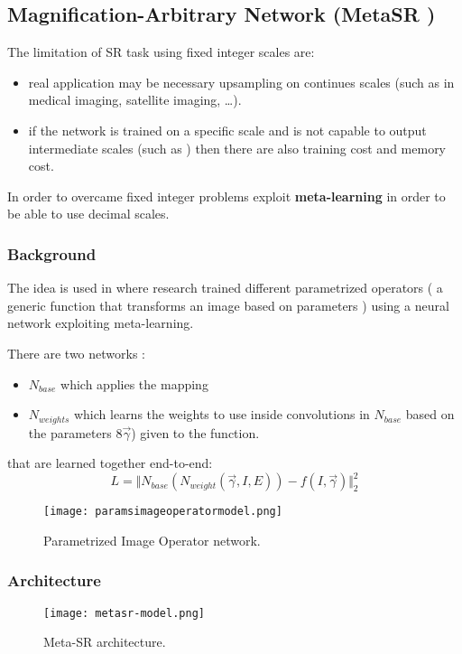 \subsection{Magnification-Arbitrary Network (MetaSR \cite{MetaSR})}\label{metasr}
The limitation of SR task using fixed integer scales are:
\begin{itemize}
    \item real application may be necessary upsampling on continues scales (such as in medical imaging, satellite imaging, \dots ).
    \item if the network is trained on a specific scale and is not capable to output intermediate scales (such as \cite{LapSRN}) then there are also training cost and memory cost.
\end{itemize}

In order to overcame fixed integer problems \cite{MetaSR} exploit \textbf{meta-learning} in order to be able to use decimal scales.

\subsubsection{Background}

The idea is used in \cite{ParametrizedImageOperator} where research trained different parametrized operators ( a generic function that transforms an image based on parameters ) using a neural network exploiting meta-learning.

There are two networks :
\begin{itemize}
    \item $N_{base}$ which applies the mapping
    \item $N_{weights}$ which learns the weights to use inside convolutions in $N_{base}$ based on the parameters 8$\vec{\gamma}$) given to the function. 
\end{itemize}
that are learned together end-to-end: 
$$
L = \Vert N_{base}(N_{weight}(\vec{\gamma},I,E)) - f(I,\vec{\gamma}) \Vert_2^2
$$
\begin{figure}
    \centering
    \texttt{[image: paramsimageoperatormodel.png]}
    \caption{Parametrized Image Operator network.}\label{PIO:model}
\end{figure}

\subsubsection{Architecture}
\begin{figure}
    \centering
    \texttt{[image: metasr-model.png]}
    \caption{Meta-SR architecture.}\label{metasr:model}
\end{figure}

